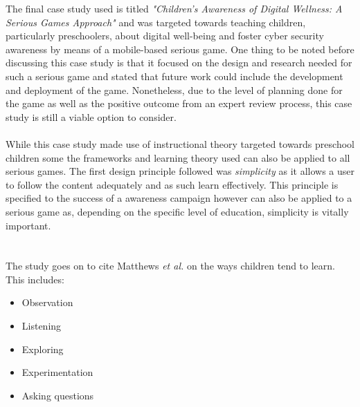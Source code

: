\documentclass[conference]{IEEEtran}
\begin{document}
The final case study used is titled \textit{"Children’s Awareness of Digital Wellness: A Serious Games Approach"} and was targeted towards teaching children, particularly preschoolers, about digital well-being and foster cyber security awareness by means of a mobile-based serious game\cite{allers2021children}. One thing to be noted before discussing this case study is that it focused on the design and research needed for such a serious game and stated that future work could include the development and deployment of the game\cite{allers2021children}. Nonetheless, due to the level of planning done for the game as well as the positive outcome from an expert review process, this case study is still a viable option to consider. 
\\\\
While this case study\cite{allers2021children} made use of instructional theory targeted towards preschool children\cite{matthews2007,callaghan2018} some the frameworks and learning theory used can also be applied to all serious games. The first design principle followed was \textit{simplicity} as it allows a user to follow the content adequately and as such learn effectively\cite{allers2021children}. This principle is specified to the success of a awareness campaign however can also be applied to a serious game as, depending on the specific level of education, simplicity is vitally important. 
\\\\\\
The study goes on to cite Matthews \textit{et al.}\cite{matthews2007} on the ways children tend to learn. This includes:
\begin{itemize}
\item Observation
\item Listening
\item Exploring
\item Experimentation
\item Asking questions
\end{itemize}
\end{document}
